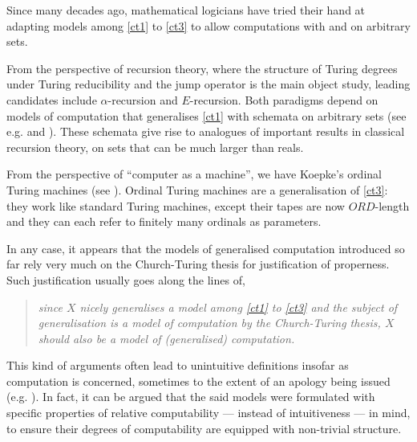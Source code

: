 \documentclass[12pt, twoside]{memoir}
\numberwithin{equation}{section}
\theoremstyle{definition}
\theoremstyle{remark}
\theoremstyle{definition}
\theoremstyle{definition}
\theoremstyle{definition}
\theoremstyle{remark}
\begin{document}
Since many decades ago, mathematical logicians have tried their hand at adapting models among \ref{ct1} to \ref{ct3} to allow computations with and on arbitrary sets.

From the perspective of recursion theory, where the structure of Turing degrees under Turing reducibility and the jump operator is the main object study, leading candidates include $\alpha$-recursion and $E$-recursion. Both paradigms depend on models of computation that generalises \ref{ct1} with schemata on arbitrary sets (see e.g. \cite{takeuti} and \cite{normann}). These schemata give rise to analogues of important results in classical recursion theory, on sets that can be much larger than reals. 

From the perspective of ``computer as a machine'', we have Koepke's ordinal Turing machines (see \cite{koepke1}). Ordinal Turing machines are a generalisation of \ref{ct3}: they work like standard Turing machines, except their tapes are now $ORD$-length and they can each refer to finitely many ordinals as parameters. 

In any case, it appears that the models of generalised computation introduced so far rely very much on the Church-Turing thesis for justification of properness. Such justification usually goes along the lines of,
\begin{quote}
    \emph{since $X$ nicely generalises a model among \ref{ct1} to \ref{ct3} and the subject of generalisation is a model of computation by the Church-Turing thesis, $X$ should also be a model of (generalised) computation.}
\end{quote}
This kind of arguments often lead to unintuitive definitions insofar as computation is concerned, sometimes to the extent of an apology being issued (e.g. \cite{sackserec}). In fact, it can be argued that the said models were formulated with specific properties of relative computability --- instead of intuitiveness --- in mind, to ensure their degrees of computability are equipped with non-trivial structure. 
\end{document}
